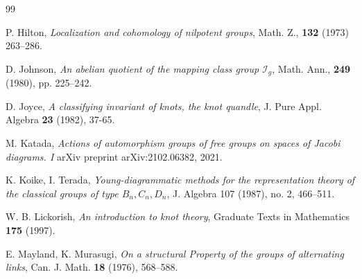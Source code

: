 \documentclass{article}
\theoremstyle{plain}
\theoremstyle{definition}
\begin{document}
{\begin{thebibliography}{99}

P. Hilton, {\it Localization and cohomology of nilpotent groups}, Math. Z., {\bf 132} (1973) 263--286.


D. Johnson, {\it An abelian quotient of the mapping class group $\mathcal{I}_g$}, Math. Ann., {\bf 249} (1980), pp. 225--242.



D. Joyce,
{\it A classifying invariant of knots, the knot quandle},
J. Pure Appl. Algebra {\bf 23} (1982), 37-65.

M. Katada, {\it Actions of automorphism groups of free groups on spaces of Jacobi diagrams. I}
arXiv preprint arXiv:2102.06382, 2021.


K. Koike, I. Terada, {\it Young-diagrammatic methods for the representation theory of the classical groups of type $B_n, C_n, D_n$}, J. Algebra 107 (1987), no. 2, 466--511.


 W. B. Lickorish, {\it An introduction to knot theory}, Graduate Texts in Mathematics {\bf 175} (1997).





E. Mayland, K. Murasugi, {\it On a structural Property of the groups of alternating links},
Can. J. Math. {\bf 18} (1976), 568--588.



\end{thebibliography}}
\end{document}
